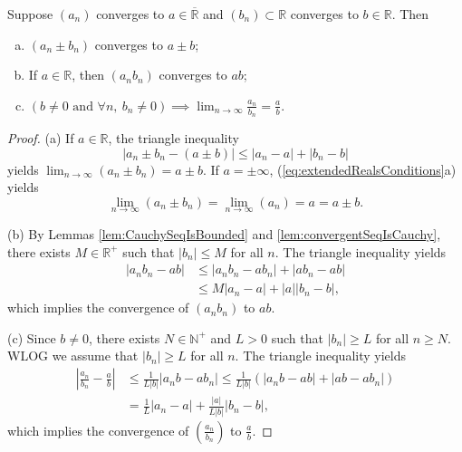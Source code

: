 \begin{thm}
  \label{thm:limitOperation}
  Suppose $(a_{n})$ converges to $a\in \overline{\mathbb{R}}$
  and $(b_{n})\subset \mathbb{R}$ converges to $b\in \mathbb{R}$.
  Then
  \begin{enumerate}[(a)]\itemsep0em
  \item $(a_{n}\pm b_{n})$ converges to $a\pm b$;
  \item If $a\in \mathbb{R}$, then $(a_{n}b_{n})$ converges to $ab$;
  \item $(b\ne 0\text{ and }\forall n,\ b_{n}\ne 0)\implies 
    \lim_{n\rightarrow \infty}\frac{a_{n}}{b_{n}} = \frac{a}{b}$.
  \end{enumerate}
\end{thm}
\begin{proof}
  (a) If $a\in \mathbb{R}$, the triangle inequality
  \begin{displaymath}
    |a_{n}\pm b_{n}-(a\pm b)|\le |a_{n}-a|+|b_{n}-b|
  \end{displaymath}
  yields $\lim_{n\rightarrow \infty}(a_{n}\pm b_{n})=a\pm b$.
  If $a=\pm\infty$, (\ref{eq:extendedRealsConditions}a) yields 
  \begin{displaymath}
    \lim_{n\rightarrow\infty}(a_{n}\pm b_{n})
    =\lim_{n\rightarrow\infty}(a_{n})=a=a\pm b.
  \end{displaymath}

  (b) By Lemmas \ref{lem:CauchySeqIsBounded}
  and \ref{lem:convergentSeqIsCauchy}, 
  there exists $M\in\mathbb{R}^+$ such that $|b_{n}|\le M$ for all $n$.
  The triangle inequality yields
  \begin{align*}
    |a_{n}b_{n}-ab|
    &\le |a_{n}b_{n}-ab_{n}|+|ab_{n}-ab|\\
    &\le M|a_{n}-a|+|a||b_{n}-b|,
  \end{align*}
  which implies the convergence of $(a_{n}b_{n})$ to $ab$.

  (c) Since $b\ne 0$, there exists $N\in \mathbb{N}^{+}$ and $L>0$
  such that $|b_{n}|\ge L$ for all $n\ge N$. WLOG we assume that
  $|b_{n}|\ge L$ for all $n$. The triangle inequality yields
  \begin{align*}
    \left| \frac{a_{n}}{b_{n}}-\frac{a}{b} \right|
    &\le \frac{1}{L|b|}|a_{n}b-ab_{n}| 
    \le \frac{1}{L|b|}(|a_{n}b-ab|+|ab-ab_{n}|) \\
    &=\frac{1}{L}|a_{n}-a|+\frac{|a|}{L|b|}|b_{n}-b|,
  \end{align*}
  which implies the convergence of $(\frac{a_{n}}{b_{n}})$
  to $\frac{a}{b}$.
\end{proof}

